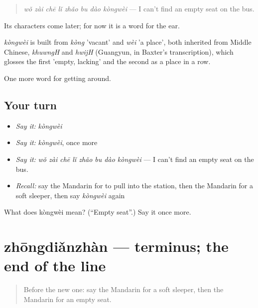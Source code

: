 \begin{quote}
\emph{wǒ zài chē lǐ zhǎo bu dào kòngwèi} — I can't find an empty seat on the bus.
\end{quote}

Its characters come later; for now it is a word for the ear.

\begin{cousinweb}
\emph{kòngwèi} is built from \emph{kòng} 'vacant' and \emph{wèi} 'a place', both inherited from Middle Chinese, \emph{khuwngH} and \emph{hwijH} (Guangyun, in Baxter's transcription), which glosses the first 'empty, lacking' and the second as a place in a row.
\end{cousinweb}

\begin{grammarlens}[title={What you've built}]
One more word for getting around.
\end{grammarlens}

\subsection*{Your turn}
\begin{itemize}
\raggedright
  \item \emph{Say it:} \emph{kòngwèi}
  \item \emph{Say it:} \emph{kòngwèi}, once more
  \item \emph{Say it:} \emph{wǒ zài chē lǐ zhǎo bu dào kòngwèi} — I can't find an empty seat on the bus.
  \item \emph{Recall:} say the Mandarin for to pull into the station, then the Mandarin for a soft sleeper, then say \emph{kòngwèi} again
\end{itemize}

\begin{tcolorbox}[breakable,colback=teal!4,colframe=teal!35!black,title={Before you move on}]
What does kòngwèi mean? (\textquotedblleft{}Empty seat\textquotedblright{}.) Say it once more.
\end{tcolorbox}
\section[zhōngdiǎnzhàn]{zhōngdiǎnzhàn — terminus; the end of the line}

\label{lesson:ZH-C407-zhongdianzhan}



\begin{quote}
Before the new one: say the Mandarin for a soft sleeper, then the Mandarin for an empty seat.
\end{quote}

